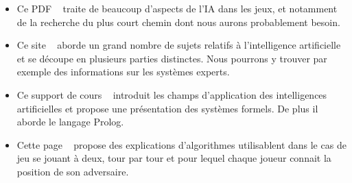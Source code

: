 \documentclass[12pt]{article}
\begin{document}
\begin{itemize}
\item Ce PDF ~\cite{ref9} traite de beaucoup d'aspects de l'IA dans les jeux, et notamment de la recherche du plus court chemin dont nous aurons probablement besoin.\\[1\baselineskip]

\item Ce site ~\cite{ref10} aborde un grand nombre de sujets relatifs à l'intelligence artificielle et se découpe en plusieurs parties distinctes. Nous pourrons y trouver par exemple des informations sur les systèmes experts.\\[1\baselineskip]

\item Ce support de cours ~\cite{ref11} introduit les champs d'application des intelligences artificielles et propose une présentation des systèmes formels. De plus il aborde le langage Prolog.\\[1\baselineskip]

\item Cette page ~\cite{ref12} propose des explications d'algorithmes utilisablent dans le cas de jeu se jouant à deux, tour par tour et pour lequel chaque joueur connait la position de son adversaire.\\[1\baselineskip]


\end{itemize}

{}

\end{document}
